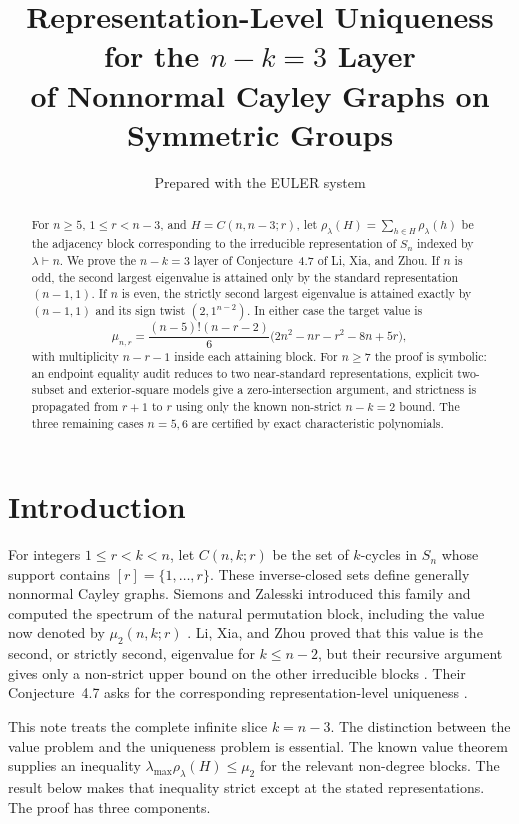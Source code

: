 \documentclass[11pt]{article}
\title{Representation-Level Uniqueness for the $n-k=3$ Layer\\
of Nonnormal Cayley Graphs on Symmetric Groups}
\author{Prepared with the EULER system}
\date{}
\theoremstyle{definition}
\newcommand{\lmax}{\lambda_{\max}}
\begin{document}
\maketitle

\begin{abstract}
For $n\geq5$, $1\leq r<n-3$, and $H=C(n,n-3;r)$, let
$\rho_\lambda(H)=\sum_{h\in H}\rho_\lambda(h)$ be the adjacency block
corresponding to the irreducible representation of $S_n$ indexed by
$\lambda\vdash n$.  We prove the $n-k=3$ layer of Conjecture~4.7 of
Li, Xia, and Zhou.  If $n$ is odd, the second largest eigenvalue is attained
only by the standard representation $(n-1,1)$.  If $n$ is even, the strictly
second largest eigenvalue is attained exactly by $(n-1,1)$ and its sign twist
$(2,1^{n-2})$.  In either case the target value is
\[
 \mu_{n,r}=\frac{(n-5)!(n-r-2)}6
 \bigl(2n^2-nr-r^2-8n+5r\bigr),
\]
with multiplicity $n-r-1$ inside each attaining block.
For $n\geq7$ the proof is symbolic: an endpoint equality audit reduces to
two near-standard representations, explicit two-subset and exterior-square
models give a zero-intersection argument, and strictness is propagated from
$r+1$ to $r$ using only the known non-strict $n-k=2$ bound.  The three
remaining cases $n=5,6$ are certified by exact characteristic polynomials.
\end{abstract}

\section{Introduction}

For integers $1\leq r<k<n$, let $C(n,k;r)$ be the set of $k$-cycles in
$S_n$ whose support contains $[r]=\{1,\dots,r\}$.  These inverse-closed sets
define generally nonnormal Cayley graphs.  Siemons and Zalesski introduced
this family and computed the spectrum of the natural permutation block,
including the value now denoted by $\mu_2(n,k;r)$
\cite{SiemonsZalesski2022}.  Li, Xia, and Zhou proved that this value is the
second, or strictly second, eigenvalue for $k\leq n-2$, but their recursive
argument gives only a non-strict upper bound on the other irreducible blocks
\cite[Theorems~4.4 and~4.6]{LiXiaZhou2026}.  Their Conjecture~4.7 asks for
the corresponding representation-level uniqueness
\cite[Conjecture~4.7]{LiXiaZhou2026}.

This note treats the complete infinite slice $k=n-3$.  The distinction
between the value problem and the uniqueness problem is essential.  The
known value theorem supplies an inequality $\lmax\rho_\lambda(H)\leq
\mu_2$ for the relevant non-degree blocks.  The result below makes that
inequality strict except at the stated representations.  The proof has three
components.
\end{document}
